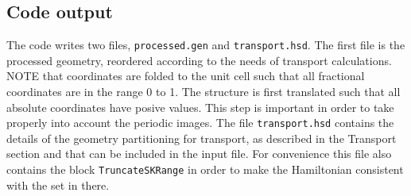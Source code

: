\subsection{Code output}

The code writes two files, \verb|processed.gen| and \verb|transport.hsd|. The first file is the
processed geometry, reordered according to the needs of transport calculations.
NOTE that coordinates are folded to the unit cell such that all fractional coordinates are in the
range 0 to 1. The structure is first translated such that all absolute coordinates have posive
values.
This step is important in order to take properly into account the periodic images.
The file \verb|transport.hsd| contains the details of the geometry partitioning for transport,
as described in the Transport section and that can be included in the input file.
For convenience this file also contains the block \verb|TruncateSKRange| in order to
make the Hamiltonian consistent with the  set in there.
